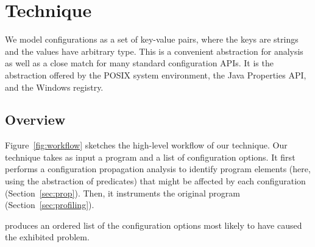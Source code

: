 \section{Technique}
\label{sec:technique}

We model configurations as a set of key-value pairs, where
the keys are strings and the values have arbitrary type. This is a
convenient abstraction for analysis as well as a close match for
many standard configuration APIs. It is the abstraction offered
by the POSIX system environment, the Java Properties API,
and the Windows registry.


\subsection{Overview}





Figure~\ref{fig:workflow} sketches the high-level workflow of our technique.
Our technique takes as input a program and a list of configuration options.
It first performs a configuration propagation analysis to identify
program elements (here, using the abstraction of predicates) that might be
affected by each configuration (Section~\ref{sec:prop}). Then, it
instruments the original program (Section~\ref{sec:profiling}).

\ourtool produces an ordered list of the 
configuration options most likely to have caused the exhibited
problem.



